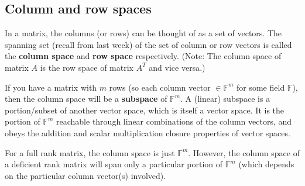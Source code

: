 \documentclass[12pt]{article}
\begin{document}
\subsection*{Column and row spaces}

In a matrix, the columns (or rows) can be thought of as a set of vectors. The spanning set (recall from last week) of the set of column or row vectors is called the \textbf{column space} and \textbf{row space} respectively. (Note: The column space of matrix $A$ is the row space of matrix $A^T$ and vice versa.)

If you have a matrix with $m$ rows (so each column vector $\in \mathbb{F}^m$ for some field $\mathbb{F}$), then the column space will be a \textbf{subspace} of $\mathbb{F}^m$. A (linear) subspace is a portion/subset of another vector space, which is itself a vector space. It is the portion of $\mathbb{F}^m$ reachable through linear combinations of the column vectors, and obeys the addition and scalar multiplication closure properties of vector spaces.

For a full rank matrix, the column space is just $\mathbb{F}^m$. However, the column space of a deficient rank matrix will span only a particular portion of $\mathbb{F}^m$ (which depends on the particular column vector(s) involved).
\end{document}
